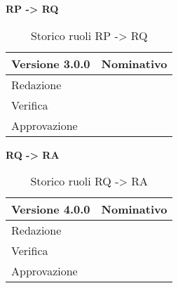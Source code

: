 \textbf{RP -> RQ}
\label{tabVers3}
\begin{table}[h]
	\begin{tabular}{p{} p{}}
		\toprule \textbf{Versione 3.0.0}	&	\textbf{Nominativo}\\
		\midrule Redazione	& \VG\\
		\midrule Verifica &	\PM\\
		\midrule Approvazione	& \FM\\
		\bottomrule
	\end{tabular}
	\caption{Storico ruoli RP -> RQ}
\end{table}

\textbf{RQ -> RA}
\label{tabVers4}
\begin{table}[h]
	\begin{tabular}{p{} p{}}
		\toprule \textbf{Versione 4.0.0}	&	\textbf{Nominativo}\\
		\midrule Redazione	& \PM\\
		\midrule Verifica &	\TP\\
		\midrule Approvazione	& \FM\\
		\bottomrule
	\end{tabular}
	\caption{Storico ruoli RQ -> RA}
\end{table}